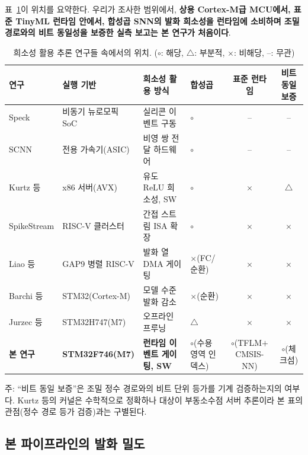 표~\ref{tab:positioning}이 위치를 요약한다. 우리가 조사한 범위에서,
\textbf{상용 Cortex-M급 MCU에서, 표준 TinyML 런타임 안에서, 합성곱
SNN의 발화 희소성을 런타임에 소비하며 조밀 경로와의 비트 동일성을
보증한 실측 보고는 본 연구가 처음이다}.

\begin{table}[t]
\centering
\caption{희소성 활용 추론 연구들 속에서의 위치. ($\circ$: 해당,
$\triangle$: 부분적, $\times$: 비해당, --: 무관)}
\label{tab:positioning}
\footnotesize
\setlength{\tabcolsep}{5pt}
\begin{tabular}{l l l l c c}
\hline
연구 & 실행 기반 & 희소성 활용 방식 & 합성곱 & 표준 런타임 & 비트 동일 보증 \\
\hline
Speck\cite{yao2024speck} & 비동기 뉴로모픽 SoC & 실리콘 이벤트 구동 & $\circ$ & -- & -- \\
SCNN\cite{parashar2017scnn} & 전용 가속기(ASIC) & 비영 쌍 전달 하드웨어 & $\circ$ & -- & -- \\
Kurtz 등\cite{kurtz2020inducing} & x86 서버(AVX) & 유도 ReLU 희소성, SW & $\circ$ & $\times$ & $\triangle$ \\
SpikeStream\cite{manoni2025spikestream} & RISC-V 클러스터 & 간접 스트림 ISA 확장 & $\circ$ & $\times$ & $\times$ \\
Liao 등\cite{liao2024snndecoder} & GAP9 병렬 RISC-V & 발화 열 DMA 게이팅 & $\times$(FC/순환) & $\times$ & $\times$ \\
Barchi 등\cite{barchi2024tuning} & STM32(Cortex-M) & 모델 수준 발화 감소 & $\times$(순환) & $\times$ & $\times$ \\
Jurzec 등\cite{jurzec2025compression} & STM32H747(M7) & 오프라인 프루닝 & $\triangle$ & $\times$ & $\times$ \\
\textbf{본 연구} & \textbf{STM32F746(M7)} & \textbf{런타임 이벤트 게이팅, SW}
& $\circ$(수용 영역 인덱스) & $\circ$(TFLM$+$CMSIS-NN) & $\circ$(체크섬) \\
\hline
\end{tabular}
\begin{flushleft}
\footnotesize 주: ``비트 동일 보증''은 조밀 정수 경로와의 비트 단위
등가를 기계 검증하는지의 여부다. Kurtz 등의 커널은 수학적으로
정확하나 대상이 부동소수점 서버 추론이라 본 표의 관점(정수 경로
등가 검증)과는 구별된다.
\end{flushleft}
\end{table}

\subsection{본 파이프라인의 발화 밀도}\label{sec:sparsity}


